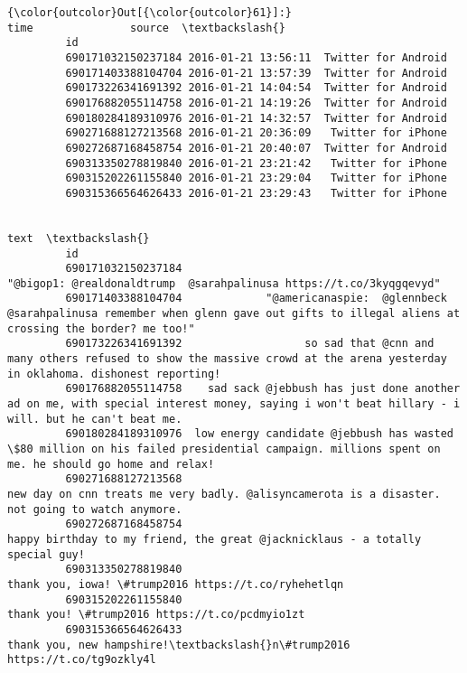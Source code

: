\documentclass[11pt]{article}
\begin{document}
\begin{Verbatim}[commandchars=\\\{\}]
{\color{outcolor}Out[{\color{outcolor}61}]:}                                   time               source  \textbackslash{}
         id                                                            
         690171032150237184 2016-01-21 13:56:11  Twitter for Android   
         690171403388104704 2016-01-21 13:57:39  Twitter for Android   
         690173226341691392 2016-01-21 14:04:54  Twitter for Android   
         690176882055114758 2016-01-21 14:19:26  Twitter for Android   
         690180284189310976 2016-01-21 14:32:57  Twitter for Android   
         690271688127213568 2016-01-21 20:36:09   Twitter for iPhone   
         690272687168458754 2016-01-21 20:40:07  Twitter for Android   
         690313350278819840 2016-01-21 23:21:42   Twitter for iPhone   
         690315202261155840 2016-01-21 23:29:04   Twitter for iPhone   
         690315366564626433 2016-01-21 23:29:43   Twitter for iPhone   
         
                                                                                                                                                                     text  \textbackslash{}
         id                                                                                                                                                                 
         690171032150237184                                                                           "@bigop1: @realdonaldtrump  @sarahpalinusa https://t.co/3kyqgqevyd"   
         690171403388104704             "@americanaspie:  @glennbeck @sarahpalinusa remember when glenn gave out gifts to illegal aliens at crossing the border? me too!"   
         690173226341691392                   so sad that @cnn and many others refused to show the massive crowd at the arena yesterday in oklahoma. dishonest reporting!   
         690176882055114758    sad sack @jebbush has just done another ad on me, with special interest money, saying i won't beat hillary - i will. but he can't beat me.   
         690180284189310976  low energy candidate @jebbush has wasted \$80 million on his failed presidential campaign. millions spent on me. he should go home and relax!   
         690271688127213568                                               new day on cnn treats me very badly. @alisyncamerota is a disaster. not going to watch anymore.   
         690272687168458754                                                                 happy birthday to my friend, the great @jacknicklaus - a totally special guy!   
         690313350278819840                                                                                           thank you, iowa! \#trump2016 https://t.co/ryhehetlqn   
         690315202261155840                                                                                                 thank you! \#trump2016 https://t.co/pcdmyio1zt   
         690315366564626433                                                                                 thank you, new hampshire!\textbackslash{}n\#trump2016 https://t.co/tg9ozkly4l   
         

\end{Verbatim}
\end{document}
